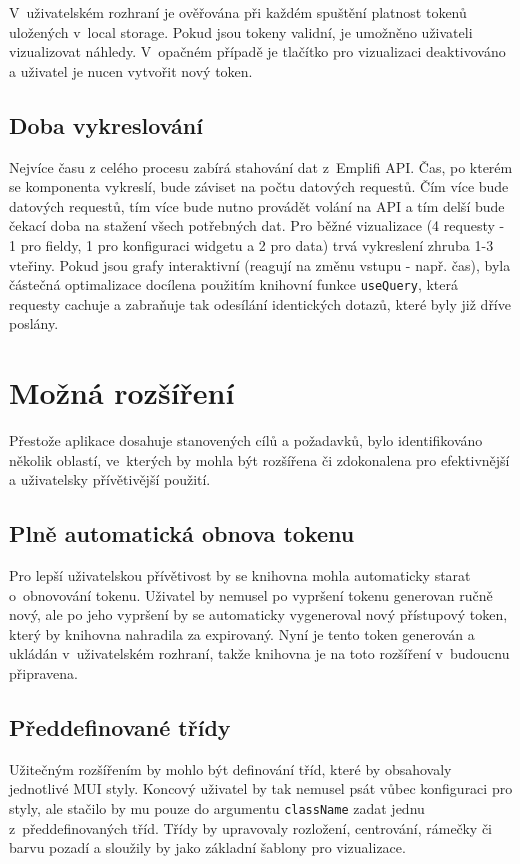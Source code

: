 \documentclass[czech, bc, kiv, he, iso690numb]{fasthesis}
\begin{document}
V~uživatelském rozhraní je ověřována při každém spuštění platnost tokenů uložených v~local storage. Pokud jsou tokeny validní, je umožněno uživateli vizualizovat náhledy. V~opačném
případě je tlačítko pro vizualizaci deaktivováno a uživatel je nucen vytvořit nový token.

\subsection{Doba vykreslování}
Nejvíce času z celého procesu zabírá stahování dat z~Emplifi API. Čas, po kterém se komponenta vykreslí, bude záviset na počtu datových requestů. Čím více bude
datových requestů, tím více bude nutno provádět volání na API a tím delší bude čekací doba na stažení všech potřebných dat. Pro běžné vizualizace (4 requesty - 1 pro fieldy,
1 pro konfiguraci widgetu a 2 pro data) trvá vykreslení zhruba 1-3 vteřiny. Pokud jsou grafy interaktivní (reagují na změnu vstupu - např. čas), byla částečná optimalizace
docílena použitím knihovní funkce \texttt{useQuery}, která requesty cachuje a zabraňuje tak odesílání identických dotazů, které byly již dříve poslány.

\section{Možná rozšíření}
Přestože aplikace dosahuje stanovených cílů a požadavků, bylo identifikováno několik oblastí, ve~kterých by mohla být rozšířena či zdokonalena pro
efektivnější a uživatelsky přívětivější použití.
~
\subsection{Plně automatická obnova tokenu}
Pro lepší uživatelskou přívětivost by se knihovna mohla automaticky starat o~obnovování tokenu. Uživatel by nemusel po vypršení tokenu generovan ručně nový, ale
po jeho vypršení by se automaticky vygeneroval nový přístupový token, který by knihovna nahradila za expirovaný.
Nyní je tento token generován a ukládán v~uživatelském rozhraní, takže knihovna je na toto rozšíření v~budoucnu připravena.

\subsection{Předdefinované třídy}
Užitečným rozšířením by mohlo být definování tříd, které by obsahovaly jednotlivé MUI styly. Koncový uživatel by tak nemusel psát vůbec konfiguraci pro styly,
ale stačilo by mu pouze do argumentu \texttt{className} zadat jednu z~předdefinovaných tříd. Třídy by upravovaly rozložení, centrování, rámečky či barvu pozadí a sloužily
by jako základní šablony pro vizualizace.
\end{document}
